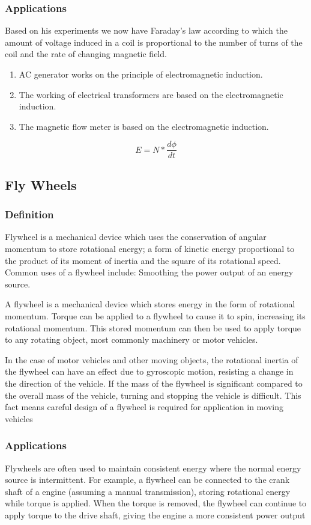 \documentclass[11pt]{article}
\begin{document}
\subsubsection{Applications}
Based on his experiments we now have Faraday’s law according to which the amount of
voltage induced in a coil is proportional to the number of turns of the coil and the rate of changing magnetic field.
\begin{enumerate}
	\item AC generator works on the principle of electromagnetic induction.
	\item The working of electrical transformers are based on the electromagnetic
	induction.
	\item The magnetic flow meter is based on the electromagnetic induction.
\end{enumerate}

$$ E = N* \frac{d\phi}{dt} $$

\subsection{Fly Wheels}
\subsubsection{Definition}
Flywheel is a mechanical device which uses the conservation of angular momentum to
store rotational energy; a form of kinetic energy proportional to the product of its
moment of inertia and the square of its rotational speed. Common uses of a flywheel
include: Smoothing the power output of an energy source.

A flywheel is a mechanical device which stores energy in the form of rotational
momentum. Torque can be applied to a flywheel to cause it to spin, increasing its
rotational momentum. This stored momentum can then be used to apply torque to any
rotating object, most commonly machinery or motor vehicles.

In the case of motor
vehicles and other moving objects, the rotational inertia of the flywheel can have an effect due to gyroscopic motion, resisting a change in the direction of the vehicle. If the mass of the flywheel is significant compared to the overall mass of the vehicle, turning and stopping the vehicle is difficult. This fact means careful design of a flywheel is required for application in moving vehicles
\subsubsection{Applications}
Flywheels are often used to maintain consistent energy where the normal energy source
is intermittent. For example, a flywheel can be connected to the crank shaft of a engine
(assuming a manual transmission), storing rotational energy while torque is applied.
When the torque is removed, the flywheel can continue to apply torque to the drive shaft,
giving the engine a more consistent power output
\end{document}
